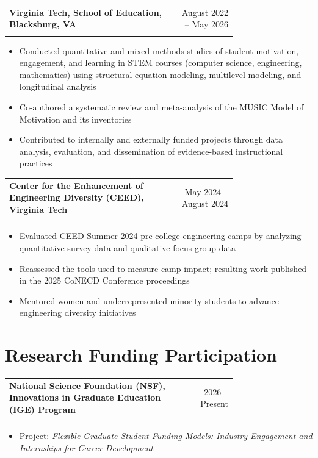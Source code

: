 \documentclass[letterpaper,11pt]{article}
\makeatletter
\newcommand{\entry}[3]{%
  \begin{tabular*}{\linewidth}[t]{@{}>{\raggedright\arraybackslash}p{0.74\linewidth}@{\extracolsep{\fill}}r@{}}
    \textbf{#1} & #2 \\
    \multicolumn{2}{@{}l@{}}{\textit{#3}} \\
  \end{tabular*}\par\vspace{1pt}}
\newenvironment{bullets}%
  {\begin{itemize}[leftmargin=1.2em, itemsep=1pt, parsep=0pt, topsep=1pt, label=\textbullet]}%
  {\end{itemize}\vspace{4pt}}
\makeatother
\begin{document}
\entry{Virginia Tech, School of Education, Blacksburg, VA}{August 2022 -- May 2026}
      {Graduate Research Assistant}
\begin{bullets}
  \item Conducted quantitative and mixed-methods studies of student motivation, engagement, and learning in STEM courses (computer science, engineering, mathematics) using structural equation modeling, multilevel modeling, and longitudinal analysis
  \item Co-authored a systematic review and meta-analysis of the MUSIC Model of Motivation and its inventories
  \item Contributed to internally and externally funded projects through data analysis, evaluation, and dissemination of evidence-based instructional practices
\end{bullets}

\entry{Center for the Enhancement of Engineering Diversity (CEED), Virginia Tech}{May 2024 -- August 2024}
      {Summer Intern, Program Evaluation}
\begin{bullets}
  \item Evaluated CEED Summer 2024 pre-college engineering camps by analyzing quantitative survey data and qualitative focus-group data
  \item Reassessed the tools used to measure camp impact; resulting work published in the 2025 CoNECD Conference proceedings
  \item Mentored women and underrepresented minority students to advance engineering diversity initiatives
\end{bullets}

\section{Research Funding Participation}
\entry{National Science Foundation (NSF), Innovations in Graduate Education (IGE) Program}{2026 -- Present}
      {Postdoctoral Fellow and quantitative research lead, Georgia Institute of Technology}
\begin{bullets}
  \item Project: \textit{Flexible Graduate Student Funding Models: Industry Engagement and Internships for Career Development}
\end{bullets}
\end{document}
